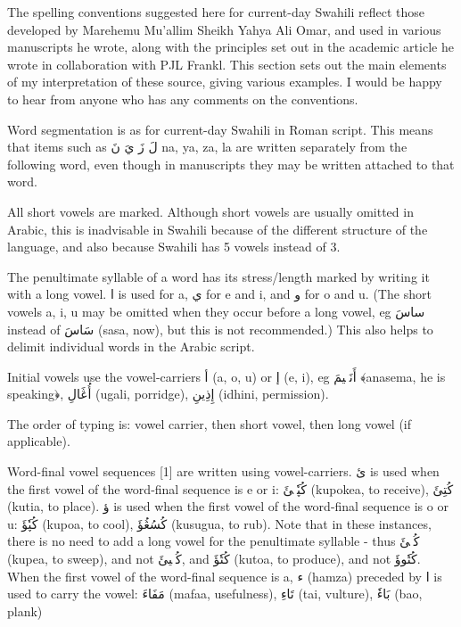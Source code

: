 \documentclass[a4paper,10pt]{article}
\begin{document}
The spelling conventions suggested here for current-day Swahili reflect those developed by Marehemu Mu'allim Sheikh Yahya Ali Omar, and used in various manuscripts he wrote, along with the principles set out in the academic article he wrote in collaboration with PJL Frankl. This section sets out the main elements of my interpretation of these source, giving various examples. I would be happy to hear from anyone who has any comments on the conventions. 

Word segmentation is as for current-day Swahili in Roman script. This means that items such as لَ زَ يَ نَ na, ya, za, la are written separately from the following word, even though in manuscripts they may be written attached to that word.

All short vowels are marked. Although short vowels are usually omitted in Arabic, this is inadvisable in Swahili because of the different structure of the language, and also because Swahili has 5 vowels instead of 3.

The penultimate syllable of a word has its stress/length marked by writing it with a long vowel. ا is used for a, ي for e and i, and و for o and u. (The short vowels a, i, u may be omitted when they occur before a long vowel, eg ساسَ instead of سَاسَ (sasa, now), but this is not recommended.) This also helps to delimit individual words in the Arabic script.

Initial vowels use the vowel-carriers أ (a, o, u) or إ (e, i), eg أَنَسٖيمَ ﴾anasema, he is speaking﴿, أُڠَالِ (ugali, porridge), إِذِينِ (idhini, permission).

The order of typing is: vowel carrier, then short vowel, then long vowel (if applicable).

Word-final vowel sequences [1] are written using vowel-carriers. ئ is used when the first vowel of the word-final sequence is e or i: كُپٗكٖئَ (kupokea, to receive), كُتِئَ (kutia, to place). ؤ is used when the first vowel of the word-final sequence is o or u: كُپٗؤَ (kupoa, to cool), كُسُڠُؤَ (kusugua, to rub). Note that in these instances, there is no need to add a long vowel for the penultimate syllable - thus كُپٖئَ (kupea, to sweep), and not كُپٖيئَ, and كُتٗؤَ (kutoa, to produce), and not كُتٗوؤَ. When the first vowel of the word-final sequence is a, ء (hamza) preceded by ا is used to carry the vowel: مَفَاءَ (mafaa, usefulness), تَاءِ (tai, vulture), بَاءٗ (bao, plank)
\end{document}

